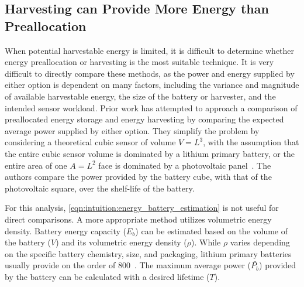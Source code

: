 \subsection{Harvesting can Provide More Energy than Preallocation}
\label{sec:intuition:energy_income_pvh}
When potential harvestable energy is limited, it is difficult to determine whether energy preallocation or harvesting is the most suitable technique.
It is very difficult to directly compare these methods, as the power and energy supplied by either option is dependent on many factors, including the variance and magnitude of available harvestable energy, the size of the battery or harvester, and the intended sensor workload.
Prior work has attempted to approach a comparison of preallocated energy storage and energy harvesting by comparing the expected average power supplied by either option.
They simplify the problem by considering a theoretical cubic sensor of volume $V = L^3$,
with the assumption that the entire cubic sensor volume is dominated by a lithium primary battery, or the entire area of one $A = L^2$ face is dominated by a photovoltaic panel~\cite{yervaGrafting12}.
The authors compare the power provided by the battery cube, with that of the photovoltaic square, over the shelf-life of the battery.

For this analysis, \cref{eqn:intuition:energy_battery_estimation} is not useful for direct comparisons.
A more appropriate method utilizes volumetric energy density.
Battery energy capacity ($E_b$) can be estimated based on the volume of the battery ($V$) and its volumetric energy density ($\rho$).
While $\rho$ varies depending on the specific battery chemistry, size, and packaging, lithium primary batteries usually provide on the order of 800\ssi[per-mode=symbol]{\milli\Wh\per\cm\cubed}~\cite{tuna2016energy}. The maximum average power ($\bar{P_b}$) provided by the battery can be calculated with a desired lifetime ($T$).


